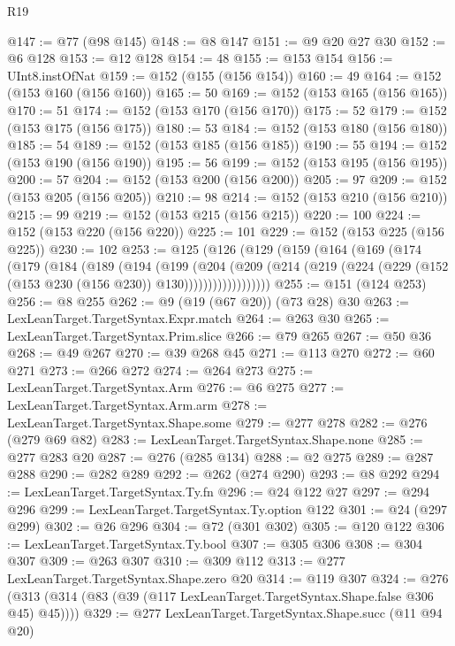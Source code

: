 \begin{lexlean}{R19}
\begin{coremodule}
{{{{{{{{{{{{{{{@147 := @77 (@98 @145)
@148 := @8 @147
@151 := @9 @20 @27 @30
@152 := @6 @128
@153 := @12 @128
@154 := 48
@155 := @153 @154
@156 := UInt8.instOfNat
@159 := @152 (@155 (@156 @154))
@160 := 49
@164 := @152 (@153 @160 (@156 @160))
@165 := 50
@169 := @152 (@153 @165 (@156 @165))
@170 := 51
@174 := @152 (@153 @170 (@156 @170))
@175 := 52
@179 := @152 (@153 @175 (@156 @175))
@180 := 53
@184 := @152 (@153 @180 (@156 @180))
@185 := 54
@189 := @152 (@153 @185 (@156 @185))
@190 := 55
@194 := @152 (@153 @190 (@156 @190))
@195 := 56
@199 := @152 (@153 @195 (@156 @195))
@200 := 57
@204 := @152 (@153 @200 (@156 @200))
@205 := 97
@209 := @152 (@153 @205 (@156 @205))
@210 := 98
@214 := @152 (@153 @210 (@156 @210))
@215 := 99
@219 := @152 (@153 @215 (@156 @215))
@220 := 100
@224 := @152 (@153 @220 (@156 @220))
@225 := 101
@229 := @152 (@153 @225 (@156 @225))
@230 := 102
@253 := @125
    (@126
      (@129
        (@159
          (@164
            (@169
              (@174
                (@179
                  (@184
                    (@189
                      (@194
                        (@199
                          (@204
                            (@209
                              (@214
                                (@219
                                  (@224 (@229 (@152 (@153 @230 (@156 @230)) @130))))))))))))))))))
@255 := @151 (@124 @253)
@256 := @8 @255
@262 := @9 (@19 (@67 @20)) (@73 @28) @30
@263 := LexLeanTarget.TargetSyntax.Expr.match
@264 := @263 @30
@265 := LexLeanTarget.TargetSyntax.Prim.slice
@266 := @79 @265
@267 := @50 @36
@268 := @49 @267
@270 := @39 @268 @45
@271 := @113 @270
@272 := @60 @271
@273 := @266 @272
@274 := @264 @273
@275 := LexLeanTarget.TargetSyntax.Arm
@276 := @6 @275
@277 := LexLeanTarget.TargetSyntax.Arm.arm
@278 := LexLeanTarget.TargetSyntax.Shape.some
@279 := @277 @278
@282 := @276 (@279 @69 @82)
@283 := LexLeanTarget.TargetSyntax.Shape.none
@285 := @277 @283 @20
@287 := @276 (@285 @134)
@288 := @2 @275
@289 := @287 @288
@290 := @282 @289
@292 := @262 (@274 @290)
@293 := @8 @292
@294 := LexLeanTarget.TargetSyntax.Ty.fn
@296 := @24 @122 @27
@297 := @294 @296
@299 := LexLeanTarget.TargetSyntax.Ty.option @122
@301 := @24 (@297 @299)
@302 := @26 @296
@304 := @72 (@301 @302)
@305 := @120 @122
@306 := LexLeanTarget.TargetSyntax.Ty.bool
@307 := @305 @306
@308 := @304 @307
@309 := @263 @307
@310 := @309 @112
@313 := @277 LexLeanTarget.TargetSyntax.Shape.zero @20
@314 := @119 @307
@324 := @276 (@313 (@314 (@83 (@39 (@117 LexLeanTarget.TargetSyntax.Shape.false @306 @45) @45))))
@329 := @277 LexLeanTarget.TargetSyntax.Shape.succ (@11 @94 @20)
}}}}}}}}}}}}}}}
\end{coremodule}
\end{lexlean}
